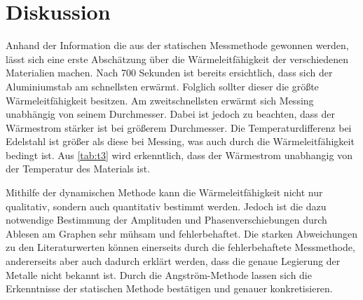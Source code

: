 \section{Diskussion}
\label{sec:Diskussion}
Anhand der Information die aus der statischen Messmethode gewonnen werden, lässt sich eine erste Abschätzung über die Wärmeleitfähigkeit der verschiedenen Materialien machen.
Nach 700 Sekunden ist bereits ersichtlich, dass sich der Aluminiumstab am schnellsten erwärmt.
Folglich sollter dieser die größte Wärmeleitfähigkeit besitzen.
Am zweitschnellsten erwärmt sich Messing unabhängig von seinem Durchmesser.
Dabei ist jedoch zu beachten, dass der Wärmestrom stärker ist bei größerem Durchmesser.
Die Temperaturdifferenz bei Edelstahl ist größer als diese bei Messing, was auch durch die Wärmeleitfähigkeit bedingt ist.
Aus \ref{tab:t3} wird erkenntlich, dass der Wärmestrom unabhangig von der Temperatur des Materials ist.

Mithilfe der dynamischen Methode kann die Wärmeleitfähigkeit nicht nur qualitativ, sondern auch quantitativ bestimmt werden.
Jedoch ist die dazu notwendige Bestimmung der Amplituden und Phasenverschiebungen durch Ablesen am Graphen sehr mühsam und fehlerbehaftet.
Die starken Abweichungen zu den Literaturwerten können einerseits durch die fehlerbehaftete 
Messmethode, andererseits aber auch dadurch erklärt werden, dass die genaue Legierung der 
Metalle nicht bekannt ist.
Durch die Angström-Methode lassen sich die Erkenntnisse der statischen Methode bestätigen und genauer konkretisieren.
